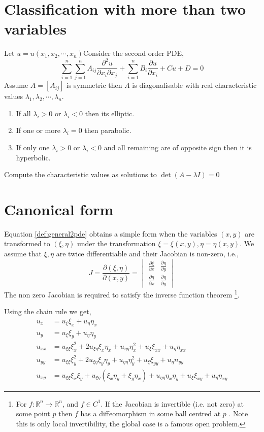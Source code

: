\documentclass[oneside,11pt,pdftex,final]{book}%
\numberwithin{equation}{section}
\numberwithin{section}{chapter}
\numberwithin{equation}{chapter}
\newcommand{\R}{\mathbb{R}}
\begin{document}
\section{Classification with more than two variables}
Let $ u=u(x_1,x_2,\cdots,x_n) $Consider the second order PDE,
\[ \sum_{i=1}^n \sum_{j=1}^n A_{ij}\frac{\partial^2 u}{\partial x_i \partial x_j} + \sum_{i=1}^n B_i \frac{\partial u}{\partial x_i}+ Cu+D=0\]
Assume $ A=[A_{ij}] $ is symmetric then $ A $ is diagonalisable with real characteristic values $ \lambda_1, \lambda_2, \cdots, \lambda_n  $.

\begin{enumerate}
	\item If all $ \lambda_i>0 $ or $ \lambda_i<0 $ then its elliptic.
	\item If one or more $ \lambda_i=0 $ then parabolic.
	\item If only one $  \lambda_i>0$ or $ \lambda_i<0 $ and all remaining are of opposite sign then it is hyperbolic.	
\end{enumerate}
Compute the characteristic values as solutions to $ \det (A-\lambda I) =0$

\section{Canonical form}
Equation \ref{def:general2pde} obtains a simple form when the variables $ (x,y) $ are transformed to $ (\xi, \eta) $ under the transformation $ \xi=\xi(x,y), \eta=\eta(x,y)$. We assume that $ \xi, \eta  $ are twice differentiable and their Jacobian is non-zero, i.e., \[ J=\frac{\partial(\xi ,\eta )}{\partial (x,y)} = \begin{vmatrix}
	\frac{\partial \xi }{\partial x} & \frac{\partial \eta }{\partial y}\\
	\frac{\partial \eta }{\partial x} & \frac{\partial \eta}{\partial y}
\end{vmatrix} \]
The non zero Jacobian is required to satisfy the inverse function theorem \footnote{For $ f: \R^n \to \R^n $, and $ f\in C^1 $. If the Jacobian is invertible (i.e. not zero) at some point $ p $ then $ f $ has a diffeomorphism in some ball centred at $ p $ . Note this is only local invertibility, the global case is a famous open problem.}.

Using the chain rule we get,
\begin{align*}
	u_{x}&=u_\xi \xi_x + u_\eta \eta_x\\
	u_y&=u_\xi \xi_y+u_\eta \eta_y\\
	u_{xx}&=u_{\xi \xi}\xi_x^2+2u_{\xi \eta}\xi_x \eta_x+u_{\eta \eta}\eta_x^2+u_\xi \xi_{xx}+u_\eta \eta_{xx}\\
	u_{yy}&=u_{\xi \xi}\xi_y^2+2u_{\xi \eta}\xi_y\eta_y+u_{\eta \eta}\eta_y^2+u_\xi \xi_{yy}+u_\eta n_{yy}\\
	u_{xy}&=u_{\xi\xi}\xi_x\xi_y+u_{\xi \eta}(\xi_x\eta_y+\xi_y\eta_x)+u_{\eta \eta}\eta_x\eta_y+u_\xi\xi_{xy}+u_{\eta}\eta_{xy}
\end{align*}
\end{document}
